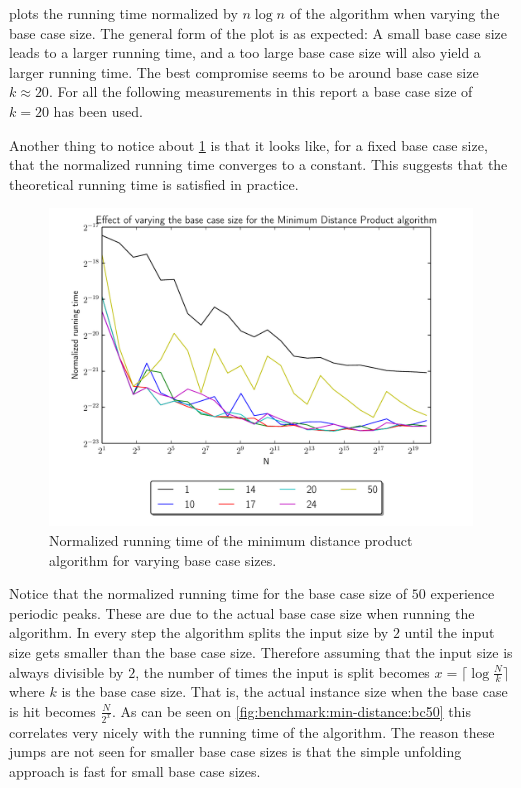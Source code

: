 \documentclass[twoside,11pt,openright]{report}
\begin{document}
 plots the running time normalized by $n\log{n}$ of the algorithm when varying the base case size. The general form of the plot is as expected: A small base case size leads to a larger running time, and a too large base case size will also yield a larger running time. The best compromise seems to be around base case size $k \approx 20$. For all the following measurements in this report a base case size of $k = 20$ has been used.

Another thing to notice about \cref{fig:benchmark:min-distance:bc} is that it looks like, for a fixed base case size, that the normalized running time converges to a constant. This suggests that the theoretical running time is satisfied in practice.

\begin{figure}[h!]
  \centering
  \includegraphics[width=11.3cm]{distance-mult/min-dist-mult-bc}
  \caption{Normalized running time of the minimum distance product algorithm for varying base case sizes.}
  \label{fig:benchmark:min-distance:bc}
\end{figure}

Notice that the normalized running time for the base case size of $50$ experience periodic peaks. These are due to the actual base case size when running the algorithm. In every step the algorithm splits the input size by $2$ until the input size gets smaller than the base case size. Therefore assuming that the input size is always divisible by $2$, the number of times the input is split becomes $x = \lceil \log{\frac{N}{k}} \rceil$ where $k$ is the base case size. That is, the actual instance size when the base case is hit becomes $\frac{N}{2^x}$. As can be seen on \cref{fig:benchmark:min-distance:bc50} this correlates very nicely with the running time of the algorithm. The reason these jumps are not seen for smaller base case sizes is that the simple unfolding approach is fast for small base case sizes.
\end{document}
